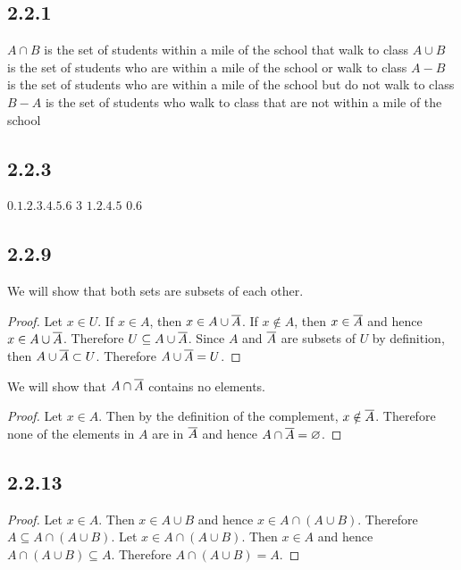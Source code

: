 \documentclass[12pt,titlepage]{extarticle}
\begin{document}

\subsection*{2.2.1}
\begin{tasks}
    \task $A \cap B$ is the set of students within a mile of the school that walk to class 
    \task $A \cup B$ is the set of students who are within a mile of the school or walk to class
    \task $A - B$ is the set of students who are within a mile of the school but do not walk to class
    \task $B - A$ is the set of students who walk to class that are not within a mile of the school
\end{tasks}

\subsection*{2.2.3}
\begin{tasks}
    \task $\qty{0,1,2,3,4,5,6}$
    \task $\qty{3}$
    \task $\qty{1,2,4,5}$
    \task $\qty{0,6}$
\end{tasks}

\subsection*{2.2.9}
\begin{tasks}
    \task We will show that both sets are subsets of each other.
    \begin{proof}
        Let $x \in U$. If $x \in A$, then $x \in A \cup \overline{A}$. If $x \notin A$, then $x \in \overline{A}$ and hence $x \in A \cup \overline{A}$. Therefore $U \subseteq A \cup \overline{A}$. Since $A$ and $\overline{A}$ are subsets of $U$ by definition, then $A \cup \overline{A} \subset U$. Therefore $A \cup \overline{A} = U$.
    \end{proof}
    \task We will show that $A \cap \overline{A}$ contains no elements.
    \begin{proof}
        Let $x \in A$. Then by the definition of the complement, $x \notin \overline{A}$. Therefore none of the elements in $A$ are in  $\overline{A}$ and hence $A \cap \overline{A} = \varnothing$.
    \end{proof}
\end{tasks}

\subsection*{2.2.13}
\begin{proof}
    Let $x \in A$. Then $x \in A \cup B$ and hence $x \in A \cap (A \cup B)$. Therefore $A \subseteq A \cap (A \cup B)$. Let $x \in A \cap (A \cup B)$. Then $x \in A$ and hence $A \cap (A \cup B) \subseteq A$. Therefore $A \cap (A \cup B) = A$.
\end{proof}
\end{document}

